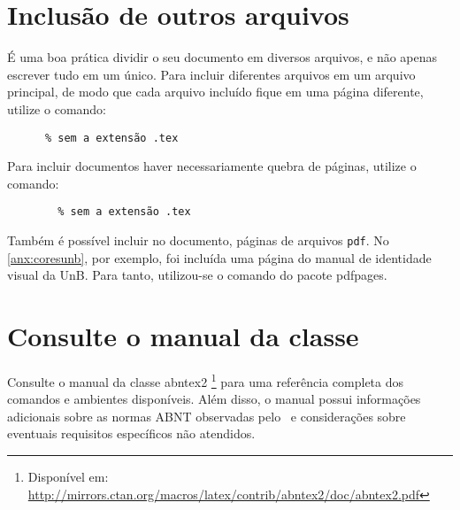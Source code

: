 \section{Inclusão de outros arquivos}\label{sec:include}

É uma boa prática dividir o seu documento em diversos arquivos, e não apenas escrever tudo em um único. Para incluir diferentes arquivos em um arquivo principal, de modo que cada arquivo incluído fique em uma página diferente, utilize o comando:
\begin{verbatim}
      % sem a extensão .tex
\end{verbatim}

Para incluir documentos haver necessariamente quebra de páginas, utilize o comando:
\begin{verbatim}
        % sem a extensão .tex
\end{verbatim}

Também é possível incluir no documento, páginas de arquivos \texttt{pdf}. No \cref{anx:coresunb}, por exemplo, foi incluída uma página do manual de identidade visual da UnB. Para tanto, utilizou-se o comando \verb|| do pacote \textsf{pdfpages}.

\section{Consulte o manual da classe \abnTeX}

Consulte o manual da classe \textsf{abntex2} \cite{abntex2classe}\footnote{Disponível em: \url{http://mirrors.ctan.org/macros/latex/contrib/abntex2/doc/abntex2.pdf}} para uma referência completa dos comandos e ambientes disponíveis. Além disso, o manual possui informações adicionais sobre as normas ABNT observadas pelo \abnTeX\ e considerações sobre eventuais requisitos específicos não atendidos.